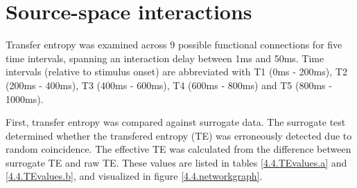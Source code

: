 \section{Source-space interactions}

Transfer entropy was examined across 9 possible functional connections for five time intervals, spanning an interaction delay between 1ms and 50ms.
Time intervals (relative to stimulus onset) are abbreviated with T1 (0ms - 200ms), T2 (200ms - 400ms), T3 (400ms - 600ms), T4 (600ms - 800ms) and T5 (800ms - 1000ms).

First, transfer entropy was compared against surrogate data.
The surrogate test determined whether the transfered entropy (TE) was erroneously detected due to random coincidence.
The effective TE was calculated from the difference between surrogate TE and raw TE.
These values are listed in tables \ref{4.4.TEvalues.a} and \ref{4.4.TEvalues.b}, and visualized in figure \ref{4.4.networkgraph}.

